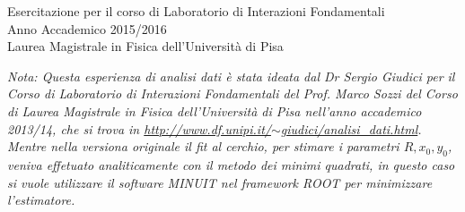 \documentclass[a4paper,9pt]{article}
\begin{document}
\begin{center}
{\Large Esercitazione per il corso di Laboratorio di Interazioni Fondamentali  \\
Anno Accademico 2015/2016\\
\vspace{0.2cm}
Laurea Magistrale in Fisica dell'Universit\`a di Pisa}\\
\end{center}

\vspace{1cm}
\noindent
\textit{Nota: Questa esperienza di analisi dati \`e stata ideata dal Dr Sergio Giudici per il Corso di Laboratorio 
di Interazioni Fondamentali del Prof. Marco Sozzi del Corso di Laurea Magistrale in Fisica dell'Universit\`a di Pisa 
nell'anno accademico 2013/14, che si trova in
\href{http://www.df.unipi.it/~giudici/analisi_dati.html}{http://www.df.unipi.it/$\sim$giudici/analisi\_dati.html}.
Mentre nella versiona originale il fit al cerchio, per stimare i parametri $R,x_0, y_0$, veniva effetuato analiticamente con 
il metodo dei minimi quadrati, in questo caso si vuole utilizzare il software MINUIT nel framework ROOT per  
minimizzare l'estimatore.}
\end{document}
